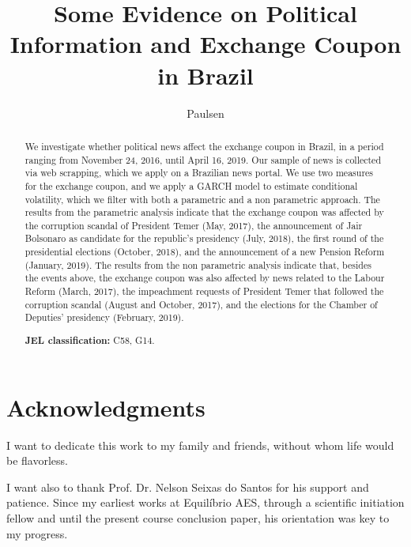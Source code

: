 \documentclass[cic,tc, english]{iiufrgs}
\title{Some Evidence on Political Information and Exchange Coupon in Brazil}
\author{Paulsen}{Bernardo Hillesheim}
\begin{document}



\chapter*{Acknowledgments}

I want to dedicate this work to my family and friends, without whom life would be flavorless. 

I want also to thank Prof. Dr. Nelson Seixas do Santos for his support and patience. Since my earliest works at Equilíbrio AES, through a scientific initiation fellow and until the present course conclusion paper, his orientation was key to my progress.



\begin{abstract}
    We investigate whether political news affect the exchange coupon in Brazil, in a period ranging from November 24, 2016, until April 16, 2019. Our sample of news is collected via web scrapping, which we apply on a Brazilian news portal. We use two measures for the exchange coupon, and we apply a GARCH model to estimate conditional volatility, which we filter with both a parametric and a non parametric approach. The results from the parametric analysis indicate that the exchange coupon was affected by the corruption scandal of President Temer (May, 2017), the announcement of Jair Bolsonaro as candidate for the republic's presidency (July, 2018), the first round of the presidential elections (October, 2018), and the announcement of a new Pension Reform (January, 2019). The results from the non parametric analysis indicate that, besides the events above, the exchange coupon was also affected by news related to the Labour Reform (March, 2017), the impeachment requests of President Temer that followed the corruption scandal (August and October, 2017), and the elections for the Chamber of Deputies' presidency (February, 2019).
    
    \noindent
    \textbf{JEL classification:} C58, G14.
    
\end{abstract}

\listoffigures
\end{document}
